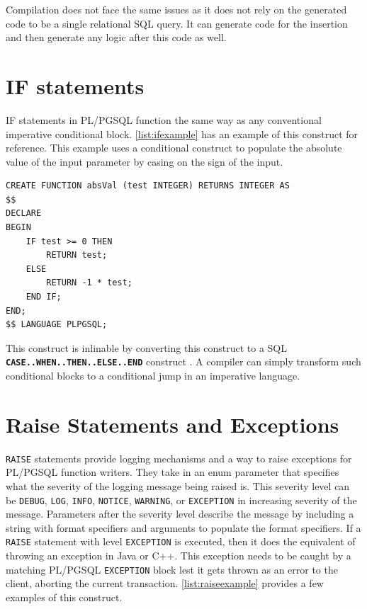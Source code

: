 \documentclass[12pt]{cmuthesis}
\newcommand{\dbSQL}[1]{\texttt{\textbf{#1}}\xspace}
\begin{document}
    Compilation does not face the same issues as it does not rely on the generated code to be a single relational SQL query. It can generate code for the insertion and then generate any logic after this code as well.

\section{IF statements}
IF statements in PL/PGSQL function the same way as any conventional imperative conditional block. \cref{list:ifexample} has an example of this construct for reference. This example uses a conditional construct to populate the absolute value of the input parameter by casing on the sign of the input.

\begin{listing}
    \begin{verbatim}
CREATE FUNCTION absVal (test INTEGER) RETURNS INTEGER AS 
$$
DECLARE
BEGIN
    IF test >= 0 THEN
        RETURN test;
    ELSE
        RETURN -1 * test;
    END IF;
END;
$$ LANGUAGE PLPGSQL;

    \end{verbatim}
    \caption{Example of PL/PGSQL UDF that uses a conditional construct to populate the absolute value of the input parameter.}
    \label{list:ifexample}
    \end{listing}

This construct is inlinable by converting this construct to a SQL \dbSQL{CASE..WHEN..THEN..ELSE..END} construct \cite{ramachandra19}. A compiler can simply transform such conditional blocks to a conditional jump in an imperative language.

\section{Raise Statements and Exceptions}
\label{sec:raise}
\texttt{RAISE} statements provide logging mechanisms and a way to raise exceptions for PL/PGSQL function writers. They take in an enum parameter that specifies what the severity of the logging message being raised is. This severity level can be \texttt{DEBUG}, \texttt{LOG}, \texttt{INFO}, \texttt{NOTICE}, \texttt{WARNING}, or \texttt{EXCEPTION} in increasing severity of the message. Parameters after the severity level describe the message by including a string with format specifiers and arguments to populate the format specifiers. If a \texttt{RAISE} statement with level \texttt{EXCEPTION} is executed, then it does the equivalent of throwing an exception in Java or C++. This exception needs to be caught by a matching PL/PGSQL \texttt{EXCEPTION} block lest it gets thrown as an error to the client, aborting the current transaction. \cref{list:raiseexample} provides a few examples of this construct.
\end{document}
